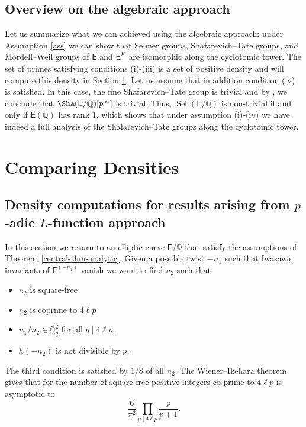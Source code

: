 \documentclass{amsart}
\numberwithin{equation}{section}
\theoremstyle{remark}
\newcommand{\Sel}{\operatorname{Sel}}
\newcommand{\Q}{\mathbb{Q}}
\newcommand{\EC}{\mathsf{E}}
\theoremstyle{plain} %
\begin{document}
\subsection{Overview on the algebraic approach}
Let us summarize what we can achieved using the algebraic approach: under Assumption \ref{ass} we can show that Selmer groups, Shafarevich--Tate groups, and Mordell--Weil groups of $\EC$ and $\EC^K$ are isomorphic along the cyclotomic tower.
The set of primes satisfying conditions (i)-(iii) is a set of positive density and will compute this density in Section \ref{sec: density}.
Let us assume that in addition condition (iv) is satisfied.
In this case, the fine Shafarevich--Tate group is trivial and by \cite[Theorem~3.4]{wuthrich2007fine}, we conclude that $\Sha(\EC/\Q)[p^\infty]$ is trivial.
Thus, $\Sel(\EC/\Q)$ is non-trivial if and only if $\EC(\Q)$ has rank 1, which shows that under assumption (i)-(iv) we have indeed a full analysis of the Shafarevich--Tate groups along the cyclotomic tower.   


\section{Comparing Densities}
\label{sec: density}

\subsection{Density computations for results arising from \texorpdfstring{$p$}{}-adic \texorpdfstring{$L$}{}-function approach}
\label{sec:den-l-function}
In this section we return to an elliptic curve $\EC/\Q$ that satisfy the assumptions of Theorem~\ref{central-thm-analytic}. 
Given a possible twist $-n_1$ such that Iwasawa invariants of $\EC^{(-n_1)}$ vanish we want to find $n_2$ such that 
\begin{itemize}
    \item $n_2$ is square-free
    \item $n_2$ is coprime to $4\ell p$
    \item $n_1/n_2\in \Q_q^2$ for all $q\mid 4\ell p$.
    \item $h(-n_2)$ is not divisible by $p$. 
\end{itemize}
The third condition is satisfied by $1/8$ of all $n_2$.
The Wiener--Ikehara theorem gives that for the number of square-free positive integers co-prime to $4\ell p$ is asymptotic to
\[
\frac{6}{\pi^2}\prod_{p\mid 4\ell p} \frac{p}{p+1}.
\]
\end{document}
